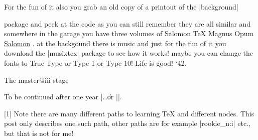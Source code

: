 For the fun of it also you grab an old copy of a printout of the |background|

package and peek at the code as you can still remember they are all similar and somewhere in the garage you have three volumes of Salomon TeX Magnus Opum \href{http://www.tug.org/TUGboat/Articles/tb17-3/tb52revb.pdf}{Salomon} . at the backgound there is music and just for the fun of it you download the |musixtex|  package to see how it works! maybe you can change the fonts to True Type or Type 1 or Type 10! Life is good!
\number`42.


The master@iii stage 

To be continued after one year |\ldots\| or |\elide|.

[1] Note there are many different paths to learning TeX and different nodes. This post only describes one such path, other paths are for example |rookie_n:i| etc., but that is not for me!
























































































